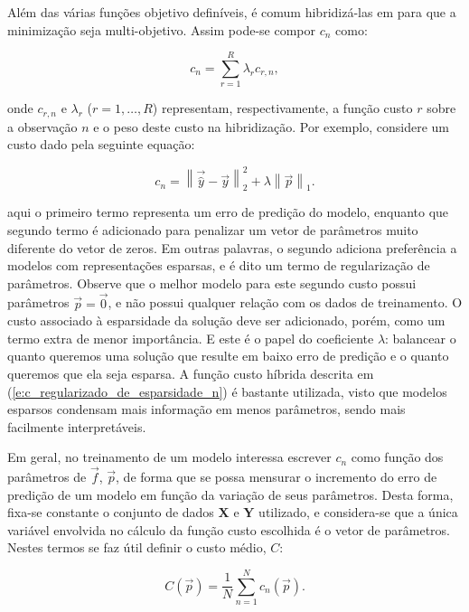     Além das várias funções objetivo definíveis, é comum hibridizá-las em para que a minimização seja multi-objetivo. Assim pode-se compor $c_n$ como:

    \begin{equation} \label{e:c_hibrida_n}
      c_n = \sum \limits_{r=1}^{R} \lambda_r c_{r,n}
      ,
    \end{equation}

    \noindent onde $c_{r,n}$ e $\lambda_r$ ($r=1,\ldots,R$) representam, respectivamente, a função custo $r$ sobre a observação $n$ e o peso deste custo na hibridização. Por exemplo, considere um custo dado pela seguinte equação:

    \begin{equation} \label{e:c_regularizado_de_esparsidade_n}
      c_n = \left\| \vec{\hat{y}} - \vec{y} \right\|_2^2 + \lambda \left\| \vec{p} \right\|_1
      .
    \end{equation}

    \noindent aqui o primeiro termo representa um erro de predição do modelo, enquanto que segundo termo é adicionado para penalizar um vetor de parâmetros muito diferente do vetor de zeros. Em outras palavras, o segundo adiciona preferência a modelos com representações esparsas, e é dito um termo de regularização de parâmetros. Observe que o melhor modelo para este segundo custo possui parâmetros $\vec{p} = \vec{0}$, e não possui qualquer relação com os dados de treinamento. O custo associado à esparsidade da solução deve ser adicionado, porém, como um termo extra de menor importância. E este é o papel do coeficiente $\lambda$: balancear o quanto queremos uma solução que resulte em baixo erro de predição e o quanto queremos que ela seja esparsa. A função custo híbrida descrita em (\ref{e:c_regularizado_de_esparsidade_n}) é bastante utilizada, visto que modelos esparsos condensam mais informação em menos parâmetros, sendo mais facilmente interpretáveis.

    Em geral, no treinamento de um modelo interessa escrever $c_n$ como função dos parâmetros de $\vec{f}$, $\vec{p}$, de forma que se possa mensurar o incremento do erro de predição de um modelo em função da variação de seus parâmetros. Desta forma, fixa-se constante o conjunto de dados $\boldsymbol{X}$ e $\boldsymbol{Y}$ utilizado, e considera-se que a única variável envolvida no cálculo da função custo escolhida é o vetor de parâmetros. Nestes termos se faz útil definir o custo médio, $C$:

    \begin{equation} \label{e:C}
      C(\vec{p}) = \frac{1}{N} \sum \limits_{n=1}^N c_n(\vec{p})
      .
    \end{equation}

